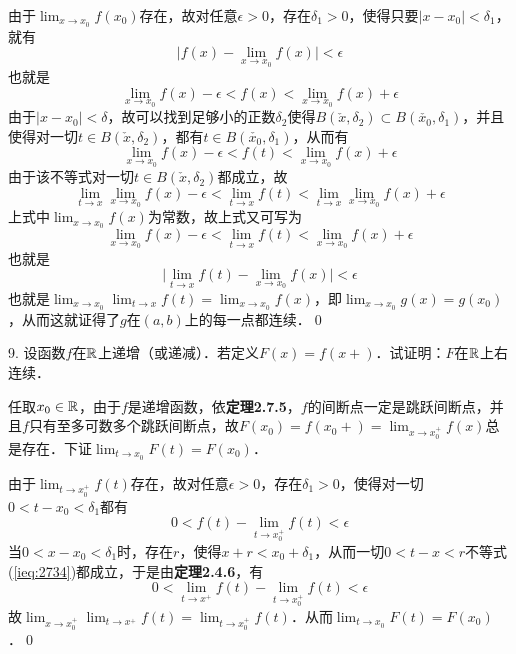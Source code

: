 由于$\displaystyle\lim_{x \to x_0} f(x_0)$存在，故对任意$\epsilon > 0$，存在$\delta_1 > 0$，使得只要$\lvert x - x_0 \rvert < \delta_1$，就有
\begin{equation}
    \lvert f(x) - \lim_{x \to x_0} f(x) \rvert < \epsilon
\end{equation}
也就是
\begin{equation}
    \lim_{x \to x_0} f(x) - \epsilon < f(x) < \lim_{x \to x_0} f(x) + \epsilon
\end{equation}
由于$\lvert x - x_0 \rvert < \delta$，故可以找到足够小的正数$\delta_2$使得$B(\check{x}, \delta_2) \subset B(\check{x_0}, \delta_1)$，并且使得对一切$t \in B(\check{x},\delta_2)$，都有$t \in B(\check{x_0},\delta_1)$，从而有
\begin{equation}
    \lim_{x \to x_0} f(x) - \epsilon < f(t) < \lim_{x \to x_0} f(x) + \epsilon
\end{equation}
由于该不等式对一切$t \in B(\check{x}, \delta_2)$都成立，故
\begin{equation}
    \lim_{t \to x}\lim_{x \to x_0} f(x) - \epsilon < \lim_{t \to x} f(t) < \lim_{t \to x}\lim_{x \to x_0} f(x) + \epsilon
\end{equation}
上式中$\displaystyle\lim_{x \to x_0} f(x)$为常数，故上式又可写为
\begin{equation}
    \lim_{x \to x_0} f(x) - \epsilon < \lim_{t \to x} f(t) < \lim_{x \to x_0} f(x) + \epsilon
\end{equation}
也就是
\begin{equation}
    \lvert \lim_{t \to x} f(t) - \lim_{x \to x_0} f(x) \rvert < \epsilon
\end{equation}
也就是$\displaystyle\lim_{x \to x_0} \lim_{t \to x} f(t) = \displaystyle\lim_{x \to x_0} f(x)$，即$\displaystyle\lim_{x \to x_0} g(x) = g(x_0)$，从而这就证得了$g$在$(a,b)$上的每一点都连续．\qed\bigskip

9. 设函数$f$在$\mathbb{R}$上递增（或递减）．若定义$F(x)=f(x+)$．试证明：$F$在$\mathbb{R}$上右连续．\bigskip

\prove 任取$x_0 \in \mathbb{R}$，由于$f$是递增函数，依\textbf{定理2.7.5}，$f$的间断点一定是跳跃间断点，并且$f$只有至多可数多个跳跃间断点，故$F(x_0) = f(x_0 +) = \displaystyle\lim_{x \to x_0^+} f(x)$总是存在．下证$\displaystyle\lim_{t \to x_0} F(t) = F(x_0)$．

由于$\displaystyle\lim_{t \to x_0^+} f(t)$存在，故对任意$\epsilon > 0$，存在$\delta_1 > 0$，使得对一切$0 < t - x_0 < \delta_1$都有
\begin{equation}
    0 < f(t) - \lim_{t \to x_0^+} f(t) < \epsilon
    \label{ieq:2734}
\end{equation}
当$0 < x - x_0 < \delta_1$时，存在$r$，使得$x+r < x_0+\delta_1$，从而一切$0< t-x  < r$不等式(\ref{ieq:2734})都成立，于是由\textbf{定理2.4.6}，有
\begin{equation}
    0 < \lim_{t \to x^+} f(t) - \lim_{t \to x_0^+} f(t) < \epsilon
\end{equation}
故$\displaystyle\lim_{x \to x_0^+} \displaystyle\lim_{t \to x^+} f(t) = \lim_{t \to x_0^+} f(t)$．从而$\displaystyle\lim_{t \to x_0} F(t) = F(x_0)$．\qed\bigskip

